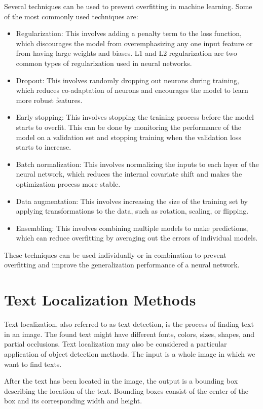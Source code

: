 Several techniques can be used to prevent overfitting in machine learning. Some of the most commonly used techniques are:

\begin{itemize}
    \item Regularization: This involves adding a penalty term to the loss function, which discourages the model from overemphasizing any one input feature or from having large weights and biases. L1 and L2 regularization are two common types of regularization used in neural networks.
    \item Dropout: This involves randomly dropping out neurons during training, which reduces co-adaptation of neurons and encourages the model to learn more robust features.
    \item Early stopping: This involves stopping the training process before the model starts to overfit. This can be done by monitoring the performance of the model on a validation set and stopping training when the validation loss starts to increase.
    \item Batch normalization: This involves normalizing the inputs to each layer of the neural network, which reduces the internal covariate shift and makes the optimization process more stable.
    \item Data augmentation: This involves increasing the size of the training set by applying transformations to the data, such as rotation, scaling, or flipping.
    \item Ensembling: This involves combining multiple models to make predictions, which can reduce overfitting by averaging out the errors of individual models.
\end{itemize}

These techniques can be used individually or in combination to prevent overfitting and improve the generalization performance of a neural network.

\section{Text Localization Methods}

Text localization, also referred to as text detection, is the process of finding text in an image. The found text might have different fonts, colors, sizes, shapes, and partial occlusions. Text localization may also be considered a particular application of object detection methods.
The input is a whole image in which we want to find texts.

After the text has been located in the image, the output is a bounding box describing the location of the text. Bounding boxes consist of the center of the box and its corresponding width and height.

